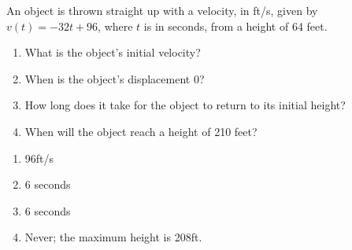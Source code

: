 {An object is thrown straight up with a velocity, in ft/s, given by $v(t) = -32t+96$, where $t$ is in seconds, from a height of 64 feet.
\begin{enumerate}
\item		What is the object's initial velocity?
\item		When is the object's displacement 0?
\item		How long does it take for the object to return to its initial height?
\item		When will the object reach a height of 210 feet?
\end{enumerate}

}
{\begin{enumerate}
\item		96ft/s
\item		6 seconds
\item		6 seconds
\item		Never; the maximum height is 208ft.
\end{enumerate}
}

